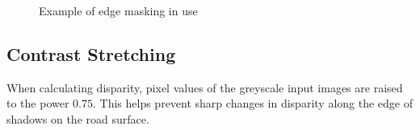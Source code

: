 \documentclass[10pt]{article}
\begin{document}
    \begin{figure}[!h]
        \centering
        \hfill
        \hfill
        \hfill

        \caption{Example of edge masking in use}
    \end{figure}
\newpage

\subsection *{Contrast Stretching}
    When calculating disparity, pixel values of the greyscale input images are raised to the power $0.75$. This helps prevent sharp changes in disparity along the edge of shadows on the road surface.
\end{document}
